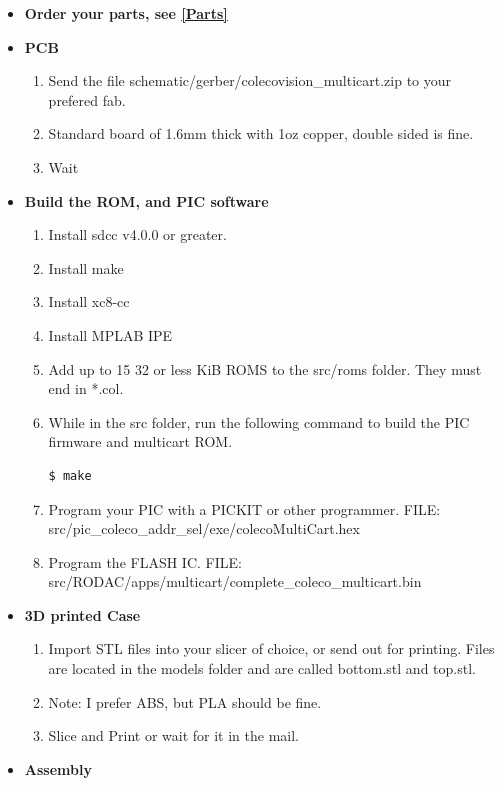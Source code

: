 \documentclass{article}
\begin{document}
  \begin{itemize}
    \item \textbf{Order your parts, see {\ref{Parts}}}
    \item \textbf{PCB}
      \begin{enumerate}
        \item Send the file schematic/gerber/colecovision\_multicart.zip to your prefered fab.
        \item Standard board of 1.6mm thick with 1oz copper, double sided is fine.
        \item Wait
      \end{enumerate}
    \item \textbf{Build the ROM, and PIC software}
      \begin{enumerate}
        \item Install sdcc v4.0.0 or greater.
        \item Install make
        \item Install xc8-cc
        \item Install MPLAB IPE
        \item Add up to 15 32 or less KiB ROMS to the src/roms folder. They must end in *.col.
        \item While in the src folder, run the following command to build the PIC firmware and multicart ROM.
        {\begin{lstlisting}[language=bash]
          $ make
        \end{lstlisting}}
        \item Program your PIC with a PICKIT or other programmer. FILE: src/pic\_coleco\_addr\_sel/exe/colecoMultiCart.hex
        \item Program the FLASH IC. FILE: src/RODAC/apps/multicart/complete\_coleco\_multicart.bin
      \end{enumerate}
    \item \textbf{3D printed Case}
      \begin{enumerate}
        \item Import STL files into your slicer of choice, or send out for printing. Files are located in the models folder and are called bottom.stl and top.stl.
        \item Note: I prefer ABS, but PLA should be fine.
        \item Slice and Print or wait for it in the mail.
      \end{enumerate}
    \item \textbf{Assembly}
      \begin{enumerate}

\end{enumerate}
\end{itemize}
\end{document}
